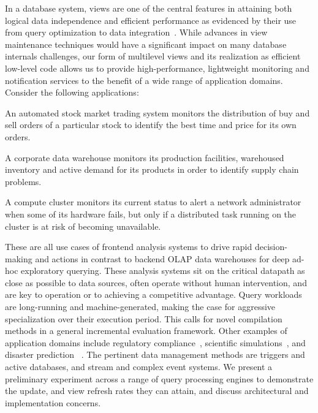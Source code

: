 In a database system, views are one of the central features in attaining both
logical data independence and efficient performance as evidenced by their use
from query optimization to data integration~\cite{halevy-vldbj01}. While
advances in view maintenance techniques would have a significant impact on many
database internals challenges, our form of multilevel views and its realization
as efficient low-level code allows us to provide high-performance, lightweight
monitoring and notification services to the benefit of a wide range of
application domains. Consider the following applications:

\vspace{-2mm}
\begin{list}{}{ \leftmargin=1em}
\addtolength{\itemsep}{-0.5\baselineskip}
\item An automated stock market trading system monitors the distribution of buy
and sell orders of a particular stock to identify the best time and price for
its own orders.

\item A corporate data warehouse monitors its production facilities, warehoused
inventory and active demand for its products in order to identify
supply chain problems.

\item A compute cluster monitors its current status to alert a network
administrator when some of its hardware fails, but only if a distributed task
running on the cluster is at risk of becoming unavailable.
\end{list}

\vspace{-1mm}
These are all use cases of frontend analysis systems to drive rapid
decision-making and actions in contrast to backend OLAP data warehouses for deep
ad-hoc exploratory querying. These analysis systems sit on the critical datapath
as close as possible to data sources, often operate without human intervention,
and are key to operation or to achieving a competitive advantage.
Query workloads are long-running and machine-generated, making the case for
aggressive specialization over their execution period. This calls for novel
compilation methods in a general incremental evaluation framework. 
Other examples of application domains include regulatory
compliance~\cite{basel2}, 
scientific simulations~\cite{hey2009fourth}, and disaster
prediction~\cite{scholz1973earthquake}
.
The pertinent data management methods are triggers and active databases, and
stream and complex event systems. We present a preliminary experiment across a
range of query processing engines to demonstrate the update, and view refresh
rates they can attain, and discuss architectural and implementation concerns.


